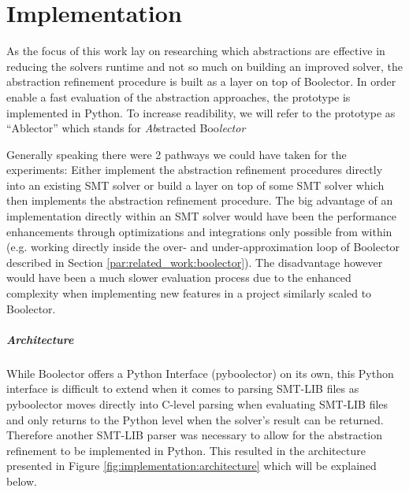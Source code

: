\chapter{Implementation}
\label{ch:implementation}
As the focus of this work lay on researching which abstractions are effective in reducing the solvers runtime and not so much on building an improved solver,
the abstraction refinement procedure is built as a layer on top of Boolector.
In order enable a fast evaluation of the abstraction approaches, the prototype is implemented in Python.
To increase readibility, we will refer to the prototype as \enquote{Ablector} which stands for \textit{Ab}stracted Boo\textit{lector}
\par
Generally speaking there were 2 pathways we could have taken for the experiments:
Either implement the abstraction refinement procedures directly into an existing SMT solver or build a layer on top of some SMT solver which then implements the abstraction refinement procedure.
The big advantage of an implementation directly within an SMT solver would have been the performance enhancements through optimizations and integrations only possible from within
(e.g. working directly inside the over- and under-approximation loop of Boolector described in Section \ref{par:related_work:boolector}).
The disadvantage however would have been a much slower evaluation process due to the enhanced complexity when implementing new features in a project similarly scaled to Boolector.


\paragraph{Architecture}
While Boolector offers a Python Interface (pyboolector) on its own, this Python interface is difficult to extend when it comes to parsing SMT-LIB files
as pyboolector moves directly into C-level parsing when evaluating SMT-LIB files and only returns to the Python level when the solver's result can be returned.
Therefore another SMT-LIB parser was necessary to allow for the abstraction refinement to be implemented in Python.
This resulted in the architecture presented in Figure \ref{fig:implementation:architecture} which will be explained below.

